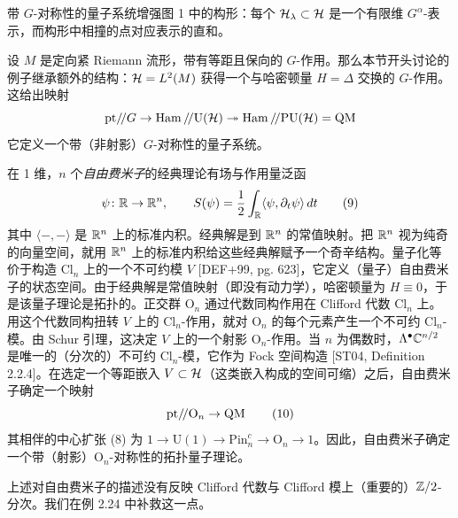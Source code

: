 \begin{remark}[2.9]
带 $G$-对称性的量子系统增强图 1 中的构形：每个 $\mathcal{H}_\lambda\subset\mathcal{H}$ 是一个有限维 $G^{\alpha}$-表示，而构形中相撞的点对应表示的直和。
\end{remark}

\begin{example}[2.10（$G$-流形上的量子力学）]
设 $M$ 是定向紧 Riemann 流形，带有等距且保向的 $G$-作用。那么本节开头讨论的例子继承额外的结构：$\mathcal{H}=L^{2}(M)$ 获得一个与哈密顿量 $H=\Delta$ 交换的 $G$-作用。这给出映射
\[
\mathrm{pt}/\!/G\to\operatorname{Ham}/\!/\mathrm{U}(\mathcal{H})\twoheadrightarrow\operatorname{Ham}/\!/\mathrm{PU}(\mathcal{H})=\operatorname{QM}
\]
它定义一个带（非射影）$G$-对称性的量子系统。
\end{example}

\begin{example}[2.11（自由费米子）]
在 1 维，$n$ 个\emph{自由费米子}的经典理论有场与作用量泛函
\begin{equation}
\psi\colon\mathbb{R}\to\mathbb{R}^{n},\qquad S(\psi)=\frac{1}{2}\int_{\mathbb{R}}\langle\psi,\partial_t\psi\rangle\,dt
\tag{9}
\end{equation}
其中 $\langle-,-\rangle$ 是 $\mathbb{R}^{n}$ 上的标准内积。经典解是到 $\mathbb{R}^{n}$ 的常值映射。把 $\mathbb{R}^{n}$ 视为纯奇的向量空间，就用 $\mathbb{R}^{n}$ 上的标准内积给这些经典解赋予一个奇辛结构。量子化等价于构造 $\mathrm{Cl}_n$ 上的一个不可约模 $V$ [DEF+99, pg. 623]，它定义（量子）自由费米子的状态空间。由于经典解是常值映射（即没有动力学），哈密顿量为 $H\equiv 0$，于是该量子理论是拓扑的。正交群 $\mathrm{O}_n$ 通过代数同构作用在 Clifford 代数 $\mathrm{Cl}_n$ 上。用这个代数同构扭转 $V$ 上的 $\mathrm{Cl}_n$-作用，就对 $\mathrm{O}_n$ 的每个元素产生一个不可约 $\mathrm{Cl}_n$-模。由 Schur 引理，这决定 $V$ 上的一个射影 $\mathrm{O}_n$-作用。当 $n$ 为偶数时，$\Lambda^{\bullet}\mathbb{C}^{n/2}$ 是唯一的（分次的）不可约 $\mathrm{Cl}_n$-模，它作为 Fock 空间构造 [ST04, Definition 2.2.4]。在选定一个等距嵌入 $V\subset\mathcal{H}$（这类嵌入构成的空间可缩）之后，自由费米子确定一个映射
\begin{equation}
\mathrm{pt}/\!/\mathrm{O}_n\to\operatorname{QM}
\tag{10}
\end{equation}
其相伴的中心扩张 (8) 为 $1\to\mathrm{U}(1)\to\mathrm{Pin}^{c}_{n}\to\mathrm{O}_n\to 1$。因此，自由费米子确定一个带（射影）$\mathrm{O}_n$-对称性的拓扑量子理论。
\end{example}

\begin{remark}[2.12]
上述对自由费米子的描述没有反映 Clifford 代数与 Clifford 模上（重要的）$\mathbb{Z}/2$-分次。我们在例 2.24 中补救这一点。
\end{remark}

